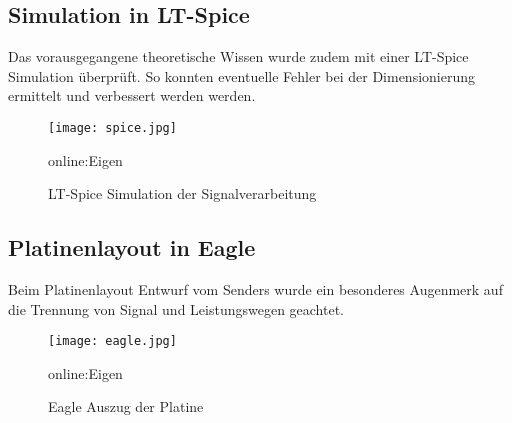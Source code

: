 \subsection{Simulation in LT-Spice}
\label{subsec:Unterabschnitt1}

Das vorausgegangene theoretische Wissen wurde zudem mit einer LT-Spice Simulation überprüft. So konnten eventuelle Fehler bei der Dimensionierung ermittelt und verbessert werden werden. 

\begin{figure}[H]
	\centering
	\texttt{[image: spice.jpg]}
	\caption[LT-Spice Simulation der Signalverarbeitung]{LT-Spice Simulation der Signalverarbeitung} \gls{online:Eigen}
	\label{fig:spice}
\end{figure}

\subsection{Platinenlayout in Eagle}
\label{subsec:Unterabschnitt12}

Beim Platinenlayout Entwurf vom Senders wurde ein besonderes Augenmerk auf die Trennung von Signal und Leistungswegen geachtet.

\begin{figure}[H]
	\centering
	\texttt{[image: eagle.jpg]}
	\caption[Eagle Auszug der Platine]{Eagle Auszug der Platine} \gls{online:Eigen}
	\label{fig:eagle}
\end{figure}

